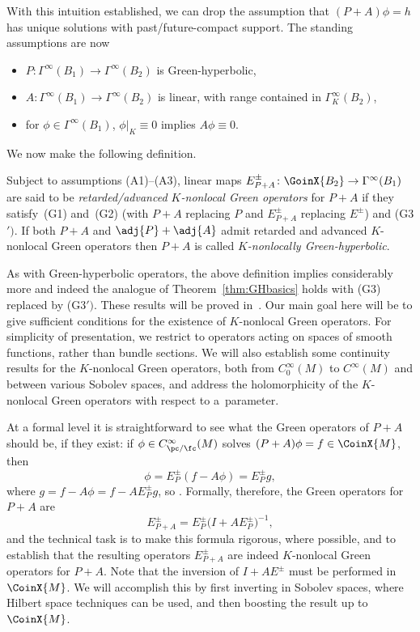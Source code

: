  With this intuition established, we can drop the assumption that $(P+A)\phi=h$ has unique solutions with past/future-compact support. The standing assumptions are now
 \begin{itemize}
 	\item[(A1)] $P\colon\Gamma^\infty(B_1)\to \Gamma^\infty(B_2)$ is Green-hyperbolic,
 	\item[(A2)] $A\colon\Gamma^\infty(B_1)\to \Gamma^\infty(B_2)$ is linear, with range contained in $\Gamma^\infty_K(B_2)$,
 	\item[(A3)] for $\phi\in \Gamma^\infty(B_1)$, $\phi|_K\equiv 0$ implies $A\phi\equiv 0$.
 \end{itemize}
 We now make the following definition.
 \begin{Definition}\label{def:KnonlocalGops}
 	Subject to assumptions (A1)--(A3), linear maps $E_{P+A}^{\pm}\colon\GoinX{B_2}\to \Gamma^\infty(B_1)$ are said to be \emph{retarded/advanced $K$-nonlocal Green operators} for $P+A$ if they satisfy~(G1) and~(G2) \big(with $P+A$ replacing $P$ and $E_{P+A}^\pm$ replacing $E^\pm$\big) and (G3${}')$. If both $P+A$ and $\adj{P}+\adj{A}$ admit retarded and advanced $K$-nonlocal Green operators then $P+A$ is called \emph{$K$-nonlocally Green-hyperbolic}.
 \end{Definition}



 As with Green-hyperbolic operators, the above definition implies considerably more and indeed the analogue of Theorem~\ref{thm:GHbasics} holds with (G3) replaced by (G3${}')$. These results will be proved in~\cite{FewVer:20xx}. Our main goal here will be to give sufficient
 conditions for the existence of $K$-nonlocal Green operators. For simplicity of presentation, we restrict to operators acting on spaces of smooth functions, rather than bundle sections. We will also establish some continuity results for the $K$-nonlocal Green operators, both from $C_0^\infty(M)$ to $C^\infty(M)$ and between various Sobolev spaces, and address the
 holomorphicity of the $K$-nonlocal Green operators with respect to a~parameter.

 At a formal level it is straightforward to see what the Green operators of $P+A$ should be, if they exist: if
 $\phi\in C^\infty_{\pc/\fc}(M)$ solves $(P+A)\phi=f\in \CoinX{M}$, then
 \begin{equation*}
 	\phi = E_P^\pm (f- A\phi) = E^\pm_{P} g,
 \end{equation*}
 where $g=f - A \phi= f- AE_P^\pm g$, so . Formally, therefore, the Green operators for $P+A$ are
 \begin{equation}\label{eq:formalGF}
 	E_{P+A}^\pm = E_P^\pm \big(I+AE^\pm_{P}\big)^{-1},
 \end{equation}
 and the technical task is to make this formula rigorous, where possible, and to establish that the resulting operators $E_{P+A}^\pm$ are indeed $K$-nonlocal Green operators for $P+A$. Note that the inversion of $I+AE^\pm$ must be performed in $\CoinX{M}$. We will accomplish this by first inverting in Sobolev spaces, where Hilbert space techniques can be used, and then boosting the result up to $\CoinX{M}$.
